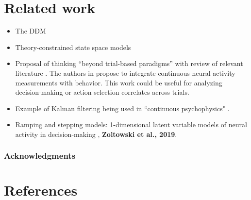 \documentclass{article}
\begin{document}
\section{Related work}
\begin{itemize}
\item The DDM \cite{ratcliff2008diffusion,gold2007neural}
\item Theory-constrained state space models \cite{linderman2017using}
\item Proposal of thinking ``beyond trial-based paradigms'' with review of relevant literature \cite{huk2018beyond}. The authors in  \cite{huk2018beyond} propose to integrate continuous neural activity measurements with behavior. This work could be useful for analyzing decision-making or action selection correlates across trials.
\item Example of Kalman filtering being used in ``continuous psychophysics" \cite{bonnen2015continuous}.
\item Ramping and stepping models: 1-dimensional latent variable models of neural activity in decision-making \cite{latimer2015single}, \textbf{Zoltowski et al., 2019}. 
\end{itemize}

\subsubsection*{Acknowledgments}


\section*{References}

\medskip

\small

%

\end{document}
